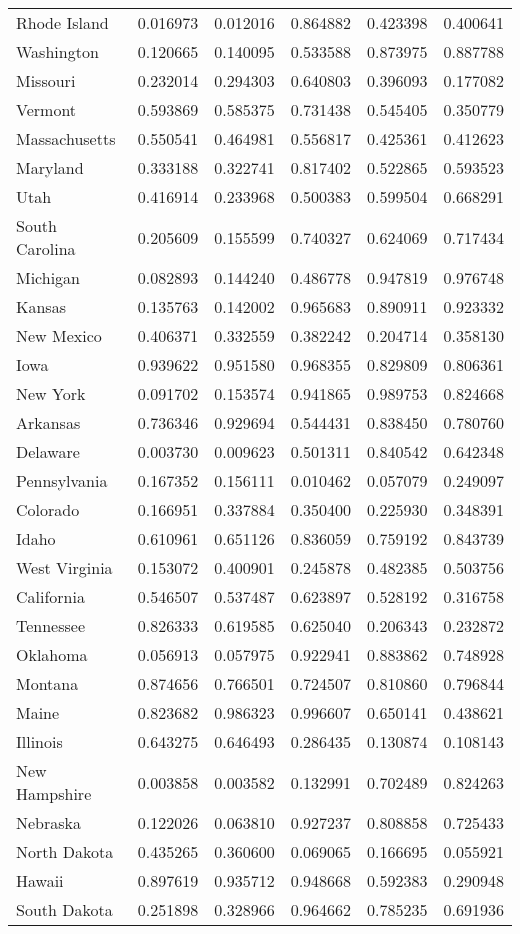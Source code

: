 \begin{tabular}{lrrrrr}
Rhode Island & 0.016973 & 0.012016 & 0.864882 & 0.423398 & 0.400641 \\
Washington & 0.120665 & 0.140095 & 0.533588 & 0.873975 & 0.887788 \\
Missouri & 0.232014 & 0.294303 & 0.640803 & 0.396093 & 0.177082 \\
Vermont & 0.593869 & 0.585375 & 0.731438 & 0.545405 & 0.350779 \\
Massachusetts & 0.550541 & 0.464981 & 0.556817 & 0.425361 & 0.412623 \\
Maryland & 0.333188 & 0.322741 & 0.817402 & 0.522865 & 0.593523 \\
Utah & 0.416914 & 0.233968 & 0.500383 & 0.599504 & 0.668291 \\
South Carolina & 0.205609 & 0.155599 & 0.740327 & 0.624069 & 0.717434 \\
Michigan & 0.082893 & 0.144240 & 0.486778 & 0.947819 & 0.976748 \\
Kansas & 0.135763 & 0.142002 & 0.965683 & 0.890911 & 0.923332 \\
New Mexico & 0.406371 & 0.332559 & 0.382242 & 0.204714 & 0.358130 \\
Iowa & 0.939622 & 0.951580 & 0.968355 & 0.829809 & 0.806361 \\
New York & 0.091702 & 0.153574 & 0.941865 & 0.989753 & 0.824668 \\
Arkansas & 0.736346 & 0.929694 & 0.544431 & 0.838450 & 0.780760 \\
Delaware & 0.003730 & 0.009623 & 0.501311 & 0.840542 & 0.642348 \\
Pennsylvania & 0.167352 & 0.156111 & 0.010462 & 0.057079 & 0.249097 \\
Colorado & 0.166951 & 0.337884 & 0.350400 & 0.225930 & 0.348391 \\
Idaho & 0.610961 & 0.651126 & 0.836059 & 0.759192 & 0.843739 \\
West Virginia & 0.153072 & 0.400901 & 0.245878 & 0.482385 & 0.503756 \\
California & 0.546507 & 0.537487 & 0.623897 & 0.528192 & 0.316758 \\
Tennessee & 0.826333 & 0.619585 & 0.625040 & 0.206343 & 0.232872 \\
Oklahoma & 0.056913 & 0.057975 & 0.922941 & 0.883862 & 0.748928 \\
Montana & 0.874656 & 0.766501 & 0.724507 & 0.810860 & 0.796844 \\
Maine & 0.823682 & 0.986323 & 0.996607 & 0.650141 & 0.438621 \\
Illinois & 0.643275 & 0.646493 & 0.286435 & 0.130874 & 0.108143 \\
New Hampshire & 0.003858 & 0.003582 & 0.132991 & 0.702489 & 0.824263 \\
Nebraska & 0.122026 & 0.063810 & 0.927237 & 0.808858 & 0.725433 \\
North Dakota & 0.435265 & 0.360600 & 0.069065 & 0.166695 & 0.055921 \\
Hawaii & 0.897619 & 0.935712 & 0.948668 & 0.592383 & 0.290948 \\
South Dakota & 0.251898 & 0.328966 & 0.964662 & 0.785235 & 0.691936 \\
\bottomrule
\end{tabular}
